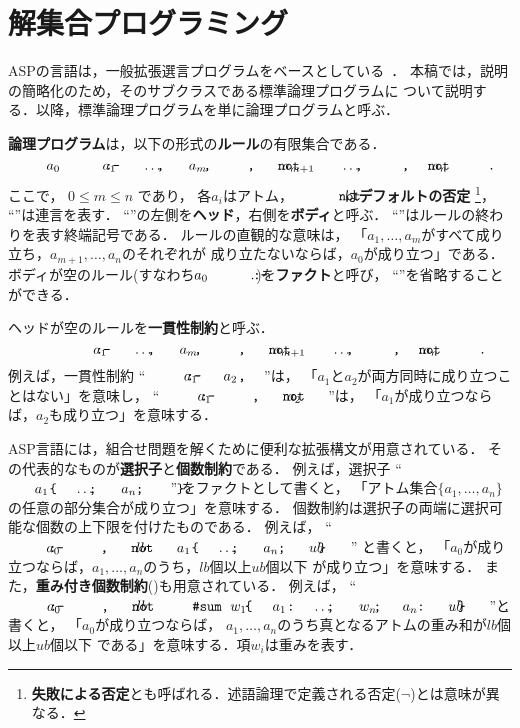 ﻿\section{解集合プログラミング}\label{chap:asp}

ASPの言語は，一般拡張選言プログラムをベースとしている~\cite{Inoue08:jssst}．
本稿では，説明の簡略化のため，そのサブクラスである標準論理プログラムに
ついて説明する．以降，標準論理プログラムを単に論理プログラムと呼ぶ．

\textbf{論理プログラム}は，以下の形式の\textbf{ルール}の有限集合である．
\begin{equation}
 \label{eq:rule}\nonumber
  a_0 ~\mcode{:-}~ a_1 \mcode{,} \dots \mcode{,} a_m \mcode{,}~%
  \naf{a_{m+1}} \mcode{,} \dots \mcode{,} \naf{a_n}\mcode{.}
\end{equation}
ここで，
$0\leq m\leq n$ であり，
各$a_i$はアトム，
$\naf{}$は\textbf{デフォルトの否定}
\footnote{\textbf{失敗による否定}とも呼ばれる．述語論理で定義される否定($\neg$)とは意味が異なる．}，
``\mcode{,}''は連言を表す．
``\mcode{:-}''の左側を\textbf{ヘッド}，右側を\textbf{ボディ}と呼ぶ．
``''はルールの終わりを表す終端記号である．
ルールの直観的な意味は，
「$a_1,\ldots,a_m$がすべて成り立ち，$a_{m+1},\ldots,a_n$のそれぞれが
成り立たないならば，$a_0$が成り立つ」である．
ボディが空のルール(すなわち\(a_0~\mcode{:-}~.\))を\textbf{ファクト}と呼び，
``\mcode{:-}''を省略することができる．

ヘッドが空のルールを\textbf{一貫性制約}と呼ぶ．
\begin{equation}
  \label{eq:constr}\nonumber
  \mcode{:-}~ a_1 \mcode{,} \dots \mcode{,} a_m \mcode{,}~%
  \naf{a_{m+1}} \mcode{,} \dots \mcode{,} \naf{a_n}\mcode{.}
\end{equation}
例えば，一貫性制約
``\(\mcode{:-}~ a_1 \mcode{,} a_2 \mcode{.}\)''は，
「$a_1$と$a_2$が両方同時に成り立つことはない」を意味し，
``\(\mcode{:-}~ a_1 \mcode{,}~\naf{a_{2}} \mcode{.}\)''は，
「$a_1$が成り立つならば，$a_2$も成り立つ」を意味する．

ASP言語には，組合せ問題を解くために便利な拡張構文が用意されている．
その代表的なものが\textbf{選択子}と\textbf{個数制約}である．
例えば，選択子
``\(\mcode{\{}a_1\mcode{;}\dots\mcode{;}a_n\mcode{\}.}\)''
をファクトとして書くと，
「アトム集合\(\{a_1,\dots,a_n\}\)の任意の部分集合が成り立つ」を意味する．
個数制約は選択子の両端に選択可能な個数の上下限を付けたものである．
例えば，
``\(\mcode{:-}~a_{0}\mcode{,}~\naf{lb\ \mcode{\{}a_1\mcode{;}\dots\mcode{;}a_n\mcode{\}}\ ub\mcode{.}}\)''
と書くと，
「$a_{0}$が成り立つならば，$a_1,\dots,a_n$のうち，$lb$個以上$ub$個以下
が成り立つ」を意味する．
また，\textbf{重み付き個数制約}()も用意されている．
例えば，
``\(\mcode{:-}~a_{0}\mcode{,}~\naf{lb\ \mcode{\#sum}~%
\mcode{\{}w_{1}\mcode{:}a_{1}\mcode{;} \dots \mcode{;}w_{n}\mcode{:}a_{n}\mcode{\}}\ ub}\mcode{.}\)''と書くと，
「$a_{0}$が成り立つならば，
$a_1,\dots,a_n$のうち真となるアトムの重み和が$lb$個以上$ub$個以下
である」を意味する．項$w_{i}$は重みを表す．

